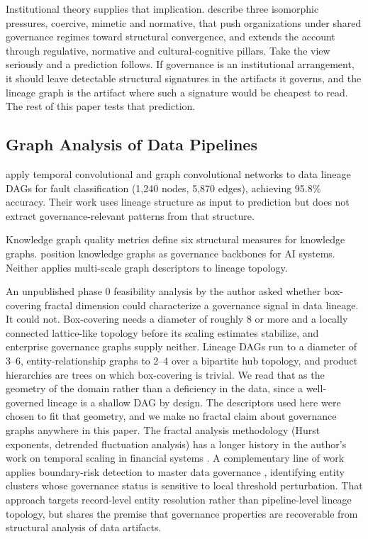 \documentclass[11pt,a4paper]{article}
\begin{document}
Institutional theory supplies that implication. \citet{dimaggio1983}
describe three isomorphic pressures, coercive, mimetic and normative,
that push organizations under shared governance regimes toward
structural convergence, and \citet{scott2013} extends the account
through regulative, normative and cultural-cognitive pillars. Take the
view seriously and a prediction follows. If governance is an
institutional arrangement, it should leave detectable structural
signatures in the artifacts it governs, and the lineage graph is the
artifact where such a signature would be cheapest to read. The rest of
this paper tests that prediction.

\subsection{Graph Analysis of Data Pipelines}

\citet{hou2026} apply temporal convolutional and graph convolutional
networks to data lineage DAGs for fault classification (1,240 nodes,
5,870 edges), achieving 95.8\% accuracy. Their work uses lineage
structure as input to prediction but does not extract governance-relevant
patterns from that structure.

Knowledge graph quality metrics \citep{seo2022} define six structural
measures for knowledge graphs. \citet{merono2024} position knowledge
graphs as governance backbones for AI systems. Neither applies
multi-scale graph descriptors to lineage topology.

An unpublished phase 0 feasibility analysis by the author
\citep{hari2026fractal} asked whether box-covering fractal dimension
could characterize a governance signal in data lineage. It could not.
Box-covering needs a diameter of roughly 8 or more and a locally
connected lattice-like topology before its scaling estimates stabilize,
and enterprise governance graphs supply neither. Lineage DAGs run to a
diameter of 3--6, entity-relationship graphs to 2--4 over a bipartite
hub topology, and product hierarchies are trees on which box-covering
is trivial. We read that as the geometry of the domain rather than a
deficiency in the data, since a well-governed lineage is a shallow DAG
by design. The descriptors used here were chosen to fit that geometry,
and we make no fractal claim about governance graphs anywhere in this
paper. The fractal analysis methodology (Hurst exponents, detrended
fluctuation analysis) has a longer history in the author's work on
temporal scaling in financial systems \citep{hari2026pvcoupling}.
A complementary line of work applies boundary-risk detection to
master data governance \citep{hari2026boundary}, identifying entity
clusters whose governance status is sensitive to local threshold
perturbation. That approach targets record-level entity resolution
rather than pipeline-level lineage topology, but shares the premise
that governance properties are recoverable from structural analysis
of data artifacts.
\end{document}
